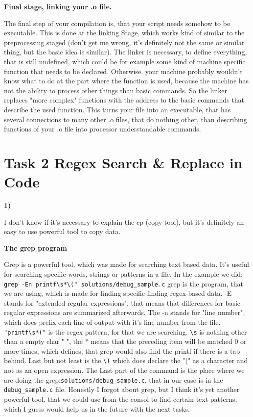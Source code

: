 \documentclass{article}
\begin{document}
\singlespacing

\textbf{Final stage, linking your .o file.}

The final step of your compilation is, that your script needs somehow to be executable. This is done at the linking Stage, which works kind of similar to the preprocessing staged (don't get me wrong, it's definitely not the same or similar thing, but the basic idea is similar). The linker is necessary, to define everything, that is still undefined, which could be for example some kind of machine specific function that needs to be declared. Otherwise, your machine probably wouldn't know what to do at the part where the function is used, because the machine has not the ability to process other things than basic commands. So the linker replaces "more complex" functions with the address to the  basic commands that describe the used function. This turns your file into an executable, that has several connections to many other .o files, that do nothing other, than describing functions of your .o file into processor understandable commands.

\section{Task 2 Regex Search \& Replace in Code}

\textbf{1)}

I don't know if it's necessary to explain the cp (copy tool), but it's definitely an easy to use powerful tool to copy data.

\singlespacing

\textbf{The grep program}

Grep is a powerful tool, which was made for searching text based data. It's useful for searching specific words, strings or patterns in a file. In the example we did: \verb!grep -En printf\s*\(" solutions/debug_sample.c! grep is the program, that we are using, which is made for finding specific finding regex-based data. -E stands for "extended regular expressions", that means that differences for basic regular expressions are summarized afterwards. The -n stands for "line number", which does prefix each line of output with it's line number from the file. \verb!"printf\s*("! is the regex pattern, for that we are searching. \verb!\s! is nothing other than a empty char " ", the * means that the preceding item will be matched 0 or more times, which defines, that grep would also find the printf if there is a tab behind. Last but not least is the \verb!\(! which does declare the "(" as a character and not as an open expression. The Last part of the command is the place where we are doing the grep:\verb!solutions/debug_sample.c!, that in our case is in the \verb!debug_sample.c! file. Honestly I forgot about grep, but I think it's yet another powerful tool, that we could use from the consol to find certain text patterns, which I guess would help us in the future with the next tasks.
\end{document}
